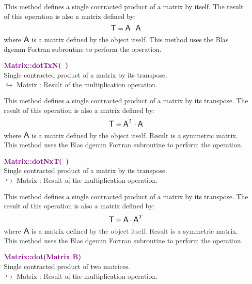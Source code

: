 This method defines a single contracted product of a matrix by itself.
The result of this operation is also a matrix defined by:
\begin{equation*}
\mbox{\large\ensuremath{\mathsf{T}}} = \mbox{\large\ensuremath{\mathsf{A}}} \cdot \mbox{\large\ensuremath{\mathsf{A}}}
\end{equation*}
where $\mbox{\large\ensuremath{\mathsf{A}}}$ is a matrix defined by the object itself.
This method uses the Blas \textsf{dgemm} Fortran subroutine to perform the operation.

\textcolor{purple}{\textbf{Matrix::dotTxN(~)}}\label{Matrix::dotTxN()}\\
Single contracted product of a matrix by its transpose.\\ \hspace*{10mm}$\hookrightarrow$ Matrix : Result of the multiplication operation.

This method defines a single contracted product of a matrix by its transpose.
The result of this operation is also a matrix defined by:
\begin{equation*}
\mbox{\large\ensuremath{\mathsf{T}}} = \mbox{\large\ensuremath{\mathsf{A}}}^T\cdot \mbox{\large\ensuremath{\mathsf{A}}}
\end{equation*}
where $\mbox{\large\ensuremath{\mathsf{A}}}$ is a matrix defined by the object itself. Result is a symmetric matrix.
This method uses the Blas \textsf{dgemm} Fortran subroutine to perform the operation.

\textcolor{purple}{\textbf{Matrix::dotNxT(~)}}\label{Matrix::dotNxT()}\\
Single contracted product of a matrix by its transpose.\\ \hspace*{10mm}$\hookrightarrow$ Matrix : Result of the multiplication operation.

This method defines a single contracted product of a matrix by its transpose.
The result of this operation is also a matrix defined by:
\begin{equation*}
\mbox{\large\ensuremath{\mathsf{T}}} = \mbox{\large\ensuremath{\mathsf{A}}} \cdot \mbox{\large\ensuremath{\mathsf{A}}}^T
\end{equation*}
where $\mbox{\large\ensuremath{\mathsf{A}}}$ is a matrix defined by the object itself. Result is a symmetric matrix.
This method uses the Blas \textsf{dgemm} Fortran subroutine to perform the operation.

\textcolor{purple}{\textbf{Matrix::dot(Matrix B)}}\label{Matrix::dot(Matrix B)}\\
Single contracted product of two matrices.\\ \hspace*{10mm}$\hookrightarrow$ Matrix : Result of the multiplication operation.

